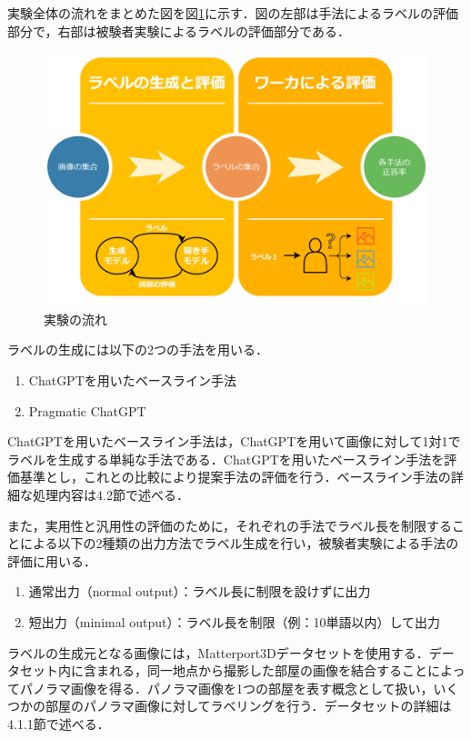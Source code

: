 \documentclass[a4paper,11pt]{jreport}
\begin{document}
実験全体の流れをまとめた図を図\ref{fig:flow_example}に示す．図の左部は手法によるラベルの評価部分で，右部は被験者実験によるラベルの評価部分である．

\begin{figure}[H]
  \centering
  \includegraphics[width=\linewidth]{figures/flow.png}
  \caption{実験の流れ}
  \label{fig:flow_example}
\end{figure}


ラベルの生成には以下の2つの手法を用いる．
\begin{enumerate}
    \item ChatGPTを用いたベースライン手法
    \item Pragmatic ChatGPT
\end{enumerate}

ChatGPTを用いたベースライン手法は，ChatGPTを用いて画像に対して1対1でラベルを生成する単純な手法である．ChatGPTを用いたベースライン手法を評価基準とし，これとの比較により提案手法の評価を行う．ベースライン手法の詳細な処理内容は4.2節で述べる．

また，実用性と汎用性の評価のために，それぞれの手法でラベル長を制限することによる以下の2種類の出力方法でラベル生成を行い，被験者実験による手法の評価に用いる．

\begin{enumerate}
    \item 通常出力（normal output）：ラベル長に制限を設けずに出力
    \item 短出力（minimal output）：ラベル長を制限（例：10単語以内）して出力
\end{enumerate}

ラベルの生成元となる画像には，Matterport3Dデータセットを使用する．データセット内に含まれる，同一地点から撮影した部屋の画像を結合することによってパノラマ画像を得る．パノラマ画像を1つの部屋を表す概念として扱い，いくつかの部屋のパノラマ画像に対してラベリングを行う．データセットの詳細は4.1.1節で述べる．
\end{document}
